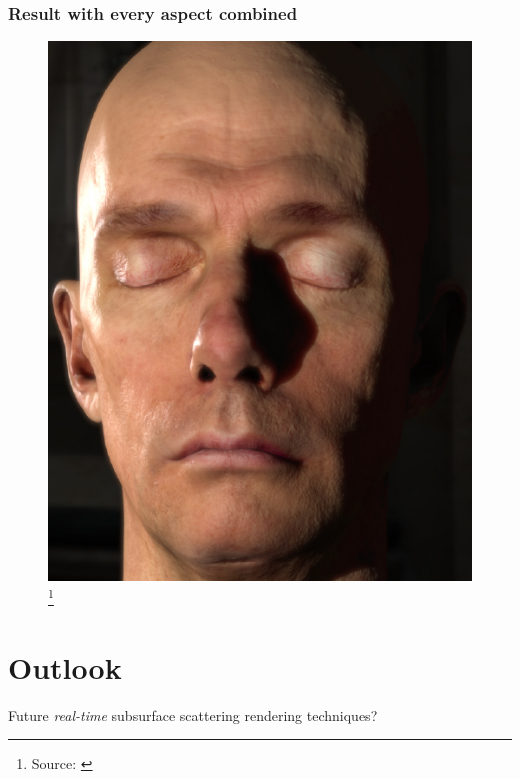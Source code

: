 \documentclass{f4_beamer_metropolis}
\newcommand\blfootnote[1]{%
  \begingroup
  \renewcommand\thefootnote{}\footnote{#1}%
  \addtocounter{footnote}{-1}%
  \endgroup
}
\begin{document}
\begin{frame}[t]
  \frametitle{Result with every aspect combined}
  \begin{figure}[!h]
    \centering
    \includegraphics[scale=0.275,keepaspectratio]{./images/nvidia-result.jpg}
    \blfootnote{Source: \citet{efficient-human-skin-rendering}}
  \end{figure}

\end{frame}

\section{Outlook}
\label{sec:outlook}

\begin{frame}[standout]
  Future \textit{real-time} subsurface scattering rendering techniques?
\end{frame}
\end{document}
